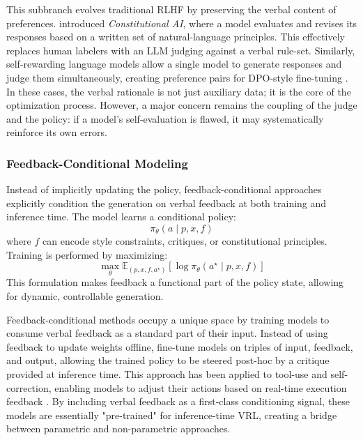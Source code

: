 This subbranch evolves traditional RLHF by preserving the verbal content of preferences. \citet{bai2022constitutional} introduced \textit{Constitutional AI}, where a model evaluates and revises its responses based on a written set of natural-language principles. This effectively replaces human labelers with an LLM judging against a verbal rule-set. Similarly, self-rewarding language models allow a single model to generate responses and judge them simultaneously, creating preference pairs for DPO-style fine-tuning \citep{yuan2025selfrewarding}. In these cases, the verbal rationale is not just auxiliary data; it is the core of the optimization process. However, a major concern remains the coupling of the judge and the policy: if a model's self-evaluation is flawed, it may systematically reinforce its own errors.

\subsubsection{Feedback-Conditional Modeling}

Instead of implicitly updating the policy, feedback-conditional approaches explicitly condition the generation on verbal feedback at both training and inference time. The model learns a conditional policy:
\begin{equation}
    \pi_\theta(a \mid p, x, f)
\end{equation}
where $f$ can encode style constraints, critiques, or constitutional principles. Training is performed by maximizing:
\begin{equation}
    \max_\theta \mathbb{E}_{(p, x, f, a^\star)} \left[ \log \pi_\theta(a^\star \mid p, x, f) \right]
\end{equation}
This formulation makes feedback a functional part of the policy state, allowing for dynamic, controllable generation.

Feedback-conditional methods occupy a unique space by training models to consume verbal feedback as a standard part of their input. Instead of using feedback to update weights offline, \citet{luo2025fcp} fine-tune models on triples of input, feedback, and output, allowing the trained policy to be steered post-hoc by a critique provided at inference time. This approach has been applied to tool-use and self-correction, enabling models to adjust their actions based on real-time execution feedback \citep{feng2025retool, kumar2025score}. By including verbal feedback as a first-class conditioning signal, these models are essentially "pre-trained" for inference-time VRL, creating a bridge between parametric and non-parametric approaches.

